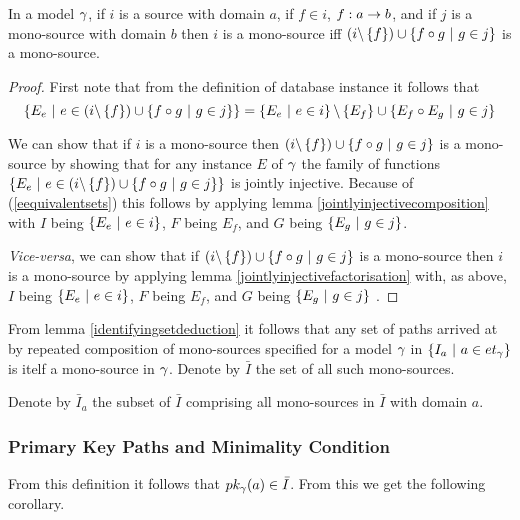 \begin{lemma}
\label{identifyingsetdeduction}

In a model $\gamma$, if $i$ is a source with domain $a$,
if $f \in i$, $f: a \rightarrow b$, and if $j$ is a mono-source with domain $b$ then 
$i$ is a mono-source iff $(i \backslash \left\{f\right\}) \cup \left\{f \circ g \ \middle|\ g \in j\right\}$ is a mono-source.
\end{lemma}
\begin{proof}
First note that from the definition of database instance it follows that 
\begin{equation}
\label{eequivalentsets}
\left\{E_e \ \middle|\ e \in (i \backslash \left\{f\right\}) \cup \left\{f \circ g \ \middle|\ g \in j\right\}\right\}
= \left\{E_e \ \middle|\ e \in i\right\} \backslash \left\{E_f\right\} \cup \left\{E_f \circ E_g \ \middle|\ g \in j\right\}
\end{equation}

We can show that if $i$ is a mono-source 
then $(i \backslash \left\{f\right\}) \cup \left\{f \circ g \ \middle|\ g \in j\right\}$ is a mono-source
by showing that for any instance $E$ of $\gamma$ the family of functions 
$\left\{E_e \ \middle|\ e \in (i \backslash \left\{f\right\}) \cup \left\{f \circ g \ \middle|\ g \in j\right\}\right\}$
is jointly injective. Because of (\ref{eequivalentsets}) this follows by applying lemma \ref{jointlyinjectivecomposition} with $I$ being $\left\{E_e \ \middle|\ e \in i\right\}$,
$F$ being $E_f$,  and $G$ being $\left\{E_g \ \middle|\ g \in j\right\}$.

\textit{Vice-versa}, we can show that if $(i \backslash \left\{f\right\}) \cup \left\{f \circ g \ \middle|\ g \in j\right\}$ is a mono-source then $i$ is a mono-source by applying lemma \ref{jointlyinjectivefactorisation} 
with, as above, $I$ being $\left\{E_e \ \middle|\ e \in i\right\}$,
$F$ being $E_f$,  and $G$ being $\left\{E_g \ \middle|\ g \in j\right\}$ .
\end{proof}

From lemma \ref{identifyingsetdeduction} it follows that any set of paths arrived at by repeated composition of mono-sources specified for a model $\gamma$ in $\left\{I_a \ \middle|\ a \in et_{\gamma}\right\}$ is itelf a mono-source in $\gamma$. Denote by $\bar{I}$ the set  of all such mono-sources.

Denote by $\bar{I}_a$ the subset of $\bar{I}$ comprising all mono-sources in $\bar{I}$ with domain $a$.

\subsubsection{Primary Key Paths and Minimality Condition}
\label{minimalitycondition}
 From this definition it follows that $pk_{\gamma}(a) \in \bar{I}$. From this we get the following corollary.


